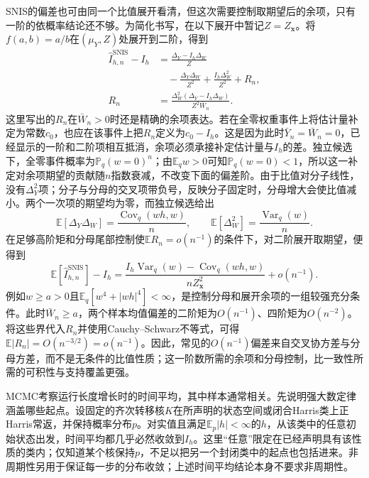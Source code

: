 SNIS的偏差也可由同一个比值展开看清，但这次需要控制取期望后的余项，只有一阶的依概率结论还不够。为简化书写，在以下展开中暂记$Z=Z_{\bm x}$。将$f(a,b)=a/b$在$(\mu_Y,Z)$处展开到二阶，得到
\[
  \begin{aligned}
    \widehat I_{h,n}^{\mathrm{SNIS}}-I_h
      &=\frac{\Delta_Y-I_h\Delta_W}{Z}\\
      &\quad-\frac{\Delta_Y\Delta_W}{Z^2}
         +\frac{I_h\Delta_W^2}{Z^2}+R_n,\\
    R_n&=\frac{\Delta_W^2(\Delta_Y-I_h\Delta_W)}
                  {Z^2\bar W_n}.
  \end{aligned}
\]
这里写出的$R_n$在$\bar W_n>0$时还是精确的余项表达。若在全零权重事件上将估计量补定为常数$c_0$，也应在该事件上把$R_n$定义为$c_0-I_h$。这是因为此时$\bar Y_n=\bar W_n=0$，已经显示的一阶和二阶项相互抵消，余项必须承接补定估计量与$I_h$的差。独立候选下，全零事件概率为$\mathbb P_q(w=0)^n$；由$\mathbb E_qw>0$可知$\mathbb P_q(w=0)<1$，所以这一补定对余项期望的贡献随$n$指数衰减，不改变下面的偏差阶。由于比值对分子线性，没有$\Delta_Y^2$项；分子与分母的交叉项带负号，反映分子固定时，分母增大会使比值减小。两个一次项的期望均为零，而独立候选给出
\[
  \mathbb E[\Delta_Y\Delta_W]
      =\frac{\operatorname{Cov}_q(wh,w)}n,\qquad
  \mathbb E[\Delta_W^2]=\frac{\operatorname{Var}_q(w)}n.
\]
在足够高阶矩和分母尾部控制使$\mathbb E R_n=o(n^{-1})$的条件下，对二阶展开取期望，便得到
\begin{equation}
  \mathbb{E}[\widehat I_{h,n}^{\mathrm{SNIS}}]-I_h
    =\frac{I_h\operatorname{Var}_q(w)-\operatorname{Cov}_q(wh,w)}
            {n Z_{\bm{x}}^2}+o(n^{-1}).
  \label{eq:pgm-sampling-snis-bias}
\end{equation}
例如$w\geq a>0$且$\mathbb{E}_q[w^4+|wh|^4]<\infty$，是控制分母和展开余项的一组较强充分条件。此时$\bar W_n\geq a$，两个样本均值偏差的二阶矩为$O(n^{-1})$、四阶矩为$O(n^{-2})$。将这些界代入$R_n$并使用Cauchy--Schwarz不等式，可得$\mathbb E|R_n|=O(n^{-3/2})=o(n^{-1})$。因此，常见的$O(n^{-1})$偏差来自交叉协方差与分母方差，而不是无条件的比值性质；这一阶数所需的余项和分母控制，比一致性所需的可积性与支持覆盖更强。

MCMC考察运行长度增长时的时间平均，其中样本通常相关。先说明强大数定律涵盖哪些起点。设固定的齐次转移核$K$在所声明的状态空间或闭合Harris类上正Harris常返，并保持概率分布$p$。对实值且满足$\mathbb E_p|h|<\infty$的$h$，从该类中的任意初始状态出发，时间平均都几乎必然收敛到$I_h$。这里“任意”限定在已经声明具有该性质的类内；仅知道某个核保持$p$，不足以把另一个封闭类中的起点也包括进来。非周期性另用于保证每一步的分布收敛；上述时间平均结论本身不要求非周期性。

